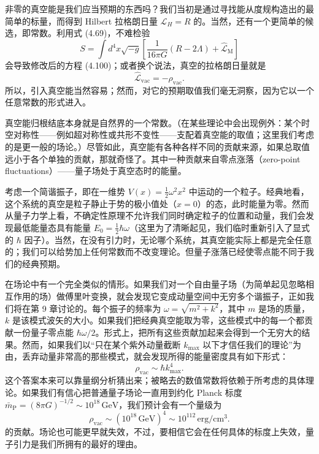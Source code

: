 非零的真空能是我们应当预期的东西吗？我们当初是通过寻找能从度规构造出的最简单的标量，而得到 Hilbert 拉格朗日量 $\widehat{\mathcal{L}}_H = R$ 的。当然，还有一个更简单的候选，即常数。利用式 (4.69)，不难检验
\begin{equation*}
S = \int d^4x\sqrt{-g}\left[\frac{1}{16\pi G}(R-2\Lambda) + \widehat{\mathcal{L}}_{\mathrm{M}}\right]
\tag{4.102}
\end{equation*}
会导致修改后的方程 (4.100)；或者换个说法，真空的拉格朗日量就是
\begin{equation*}
\widehat{\mathcal{L}}_{\mathrm{vac}} = -\rho_{\mathrm{vac}}.
\tag{4.103}
\end{equation*}
所以，引入真空能当然容易；然而，对它的预期取值我们毫无洞察，因为它以一个任意常数的形式进入。

真空能归根结底本身就是自然界的一个常数。（在某些理论中会出现例外：某个时空对称性——例如超对称性或共形不变性——支配着真空能的取值；这里我们考虑的是更一般的场论。）尽管如此，真空能有各种各样不同的贡献来源，如果总取值远小于各个单独的贡献，那就奇怪了。其中一种贡献来自零点涨落（zero-point fluctuations）——量子场处于真空态时的能量。

考虑一个简谐振子，即在一维势 $V(x)=\frac{1}{2}\omega^2 x^2$ 中运动的一个粒子。经典地看，这个系统的真空是粒子静止于势的极小值处（$x=0$）的态，此时能量为零。然而从量子力学上看，不确定性原理不允许我们同时确定粒子的位置和动量，我们会发现最低能量态具有能量 $E_0=\frac{1}{2}\hbar\omega$（这里为了清晰起见，我们临时重新引入了显式的 $\hbar$ 因子）。当然，在没有引力时，无论哪个系统，其真空能实际上都是完全任意的；我们可以给势加上任何常数而不改变理论。但量子涨落已经使零点能不同于我们的经典预期。

在场论中有一个完全类似的情形。如果我们对一个自由量子场（为简单起见忽略相互作用的场）做傅里叶变换，就会发现它变成动量空间中无穷多个谐振子，正如我们将在第 9 章讨论的。每个振子的频率为 $\omega=\sqrt{m^2+k^2}$，其中 $m$ 是场的质量，$k$ 是该模式波矢的大小。如果我们把经典真空能取为零，这些模式中的每一个都贡献一份量子零点能 $\hbar\omega/2$。形式上，把所有这些贡献加起来会得到一个无穷大的结果。然而，如果我们以“只在某个紫外动量截断 $k_{\mathrm{max}}$ 以下才信任我们的理论”为由，丢弃动量非常高的那些模式，就会发现所得的能量密度具有如下形式：
\begin{equation*}
\rho_{\mathrm{vac}} \sim \hbar k_{\mathrm{max}}^4.
\tag{4.104}
\end{equation*}
这个答案本来可以靠量纲分析猜出来；被略去的数值常数将依赖于所考虑的具体理论。如果我们有信心把普通量子场论一直用到约化 Planck 标度 $\bar{m}_{\mathrm{P}} = (8\pi G)^{-1/2} \sim 10^{18}\,\mathrm{GeV}$，我们预计会有一个量级为
\begin{equation*}
\rho_{\mathrm{vac}} \sim (10^{18}\,\mathrm{GeV})^4 \sim 10^{112}\,\mathrm{erg/cm^3}.
\tag{4.105}
\end{equation*}
的贡献。场论也可能更早就失效，不过，要相信它会在任何具体的标度上失效，量子引力是我们所拥有的最好的理由。

